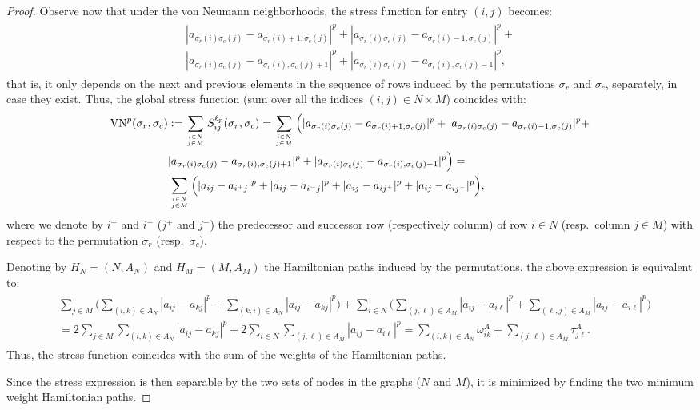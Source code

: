 \documentclass[a4paper,11pt, reqno]{amsart}
\begin{document}
\begin{proof}

Observe now that under the von Neumann neighborhoods, the stress function for entry $(i,j)$ becomes:
\begin{eqnarray*}
\begin{split}
|a_{\sigma_r(i)\sigma_c(j)} - a_{\sigma_r(i)+1,\sigma_c(j)}|^p + |a_{\sigma_r(i)\sigma_c(j)} - a_{\sigma_r(i)-1,\sigma_c(j)}|^p +\\ |a_{\sigma_r(i)\sigma_c(j)} - a_{\sigma_r(i),\sigma_c(j)+1}|^p +
|a_{\sigma_r(i)\sigma_c(j)} - a_{\sigma_r(i),\sigma_c(j)-1}|^p,
\end{split}
\end{eqnarray*}
that is, it only depends on the next and previous elements in the sequence of rows induced by the permutations $\sigma_r$ and $\sigma_c$, separately, in case they exist. Thus, the global stress function (sum over all the indices $(i,j) \in N \times M$) coincides with:
\begin{eqnarray*}
\begin{split}
{\rm VN}^p(\sigma_r,\sigma_c) &:= 
\sum_{i\in N\atop j \in M} S_{ij}^{\ell_p}(\sigma_r,\sigma_c) = 
\sum_{i\in N\atop j \in M} \Big(
|a_{\sigma_r(i)\sigma_c(j)} - a_{\sigma_r(i)+1,\sigma_c(j)}|^p + 
|a_{\sigma_r(i)\sigma_c(j)} - a_{\sigma_r(i)-1,\sigma_c(j)}|^p+ \\ &
|a_{\sigma_r(i)\sigma_c(j)} - a_{\sigma_r(i),\sigma_c(j)+1}|^p +
|a_{\sigma_r(i)\sigma_c(j)} - a_{\sigma_r(i),\sigma_c(j)-1}|^p
\Big) = \\
& \sum_{i\in N\atop j \in M} \Big(
|a_{ij} - a_{i^+j}|^p + |a_{ij} - a_{i^-j}|^p  + |a_{ij} - a_{ij^+}|^p +
|a_{ij} - a_{ij^-}|^p \Big),
\end{split}
\end{eqnarray*}
where we denote by $i^+$ and $i^-$ ($j^+$ and $j^-$) the predecessor and successor row (respectively column) of row $i\in N$ (resp.\ column $j\in M$) with respect to the permutation $\sigma_r$ (resp.\ $\sigma_c$). 

Denoting by $H_N=(N,A_N)$ and $H_M=(M,A_M)$ the Hamiltonian paths induced by the permutations, the above expression is equivalent to:
\begin{eqnarray*}
\begin{split}
&\sum_{j\in M} \Big(\sum_{(i,k) \in A_N} |a_{ij} - a_{kj}|^p + \sum_{(k,i) \in A_N} |a_{ij} - a_{kj}|^p\Big) + \sum_{i\in N} \Big( \sum_{(j,\ell ) \in A_M} |a_{ij} - a_{i\ell }|^p + \sum_{(\ell ,j) \in A_M} |a_{ij} - a_{i\ell }|^p\Big) \\
&= 2 \sum_{j\in M} \sum_{(i,k) \in A_N} |a_{ij} - a_{kj}|^p + 2  \sum_{i\in N}\sum_{(j,\ell ) \in A_M} |a_{ij} - a_{i\ell }|^p = \sum_{(i,k) \in A_N} \omega_{ik}^A + \sum_{(j,\ell ) \in A_M} \tau_{j\ell }^A.
\end{split}
\end{eqnarray*}
Thus, the stress function coincides with the sum of the weights of the Hamiltonian paths. 

Since the stress expression is then separable by the two sets of nodes in the graphs ($N$ and $M$), it is minimized by finding the two minimum weight Hamiltonian paths.
 \end{proof}
\end{document}

